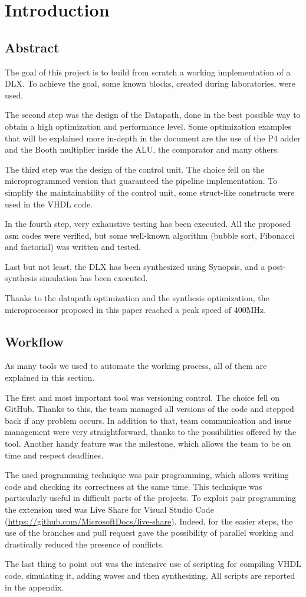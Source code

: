 \chapter{Introduction}

\section{Abstract}
The goal of this project is to build from scratch a working implementation of a DLX. To achieve the goal, some known blocks, created during laboratories, were used. 

The second step was the design of the Datapath, done in the best possible way to obtain a high optimization and performance level. Some optimization examples that will be explained more in-depth in the document are the use of the P4 adder and the Booth multiplier inside the ALU, the comparator and many others. 

The third step was the design of the control unit. The choice fell on the microprogrammed version that guaranteed the pipeline implementation. To simplify the maintainability of the control unit, some struct-like constructs were used in the VHDL code. 

In the fourth step, very exhaustive testing has been executed. All the proposed asm codes were verified, but some well-known algorithm (bubble sort, Fibonacci and factorial) was written and tested.

Last but not least, the DLX has been synthesized using Synopsis, and a post-synthesis simulation has been executed. 

Thanks to the datapath optimization and the synthesis optimization, the microprocessor proposed in this paper reached a peak speed of 400MHz.  
\section{Workflow}
As many tools we used to automate the working process, all of them are explained in this section.

The first and most important tool was versioning control. The choice fell on GitHub. Thanks to this, the team managed all versions of the code and stepped back if any problem occurs. In addition to that, team communication and issue management were very straightforward, thanks to the possibilities offered by the tool. Another handy feature was the milestone, which allows the team to be on time and respect deadlines. 

The used programming technique was pair programming, which allows writing code and checking its correctness at the same time. This technique was particularly useful in difficult parts of the projects. To exploit pair programming the extension used was Live Share for Visual Studio Code (\url{https://github.com/MicrosoftDocs/live-share}). Indeed, for the easier steps, the use of the branches and pull request gave the possibility of parallel working and drastically reduced the presence of conflicts. 

The last thing to point out was the intensive use of scripting for compiling VHDL code, simulating it, adding waves and then synthesizing. All scripts are reported in the appendix.
